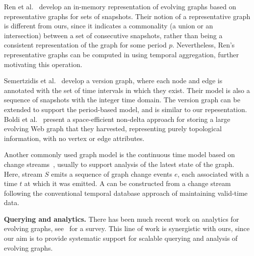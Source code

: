 Ren et al.~\cite{Ren2011} develop an in-memory representation of
evolving graphs based on representative graphs for sets of snapshots.
Their notion of a representative graph is different from ours, since
it indicates a commonality (a union or an intersection) between a set
of consecutive snapshots, rather than being a consistent
representation of the graph for some period $p$.  Nevertheless, Ren's
representative graphs can be computed in \ql using temporal
aggregation, further motivating this operation.

Semertzidis et al.~\cite{Semertzidis2015} develop a version graph,
where each node and edge is annotated with the set of time intervals
in which they exist.  Their model is also a sequence of snapshots with
the integer time domain.  The version graph can be extended to support
the period-based model, and is similar to our \og 
repesentation.
%
Boldi et al.~\cite{Boldi2008} present a space-efficient non-delta
approach for storing a large evolving Web graph that they harvested,
representing purely topological information, with no vertex or edge
attributes.

Another commonly used graph model is the continuous time model based
on change streams~\cite{Cheng2012,Ediger2012}, usually to support
analysis of the latest state of the graph.  Here, stream $S$ emits a
sequence of graph change events $e$, each associated with a time $t$
at which it was emitted. A \tg can be constructed from a change stream following the
conventional temporal database approach of maintaining valid-time
data.


{\bf Querying and analytics.} There has been much recent work on
analytics for evolving graphs,
see~\cite{DBLP:journals/csur/AggarwalS14} for a survey. This line of
work is synergistic with ours, since our aim is to provide systematic
support for scalable querying and analysis of evolving graphs.

